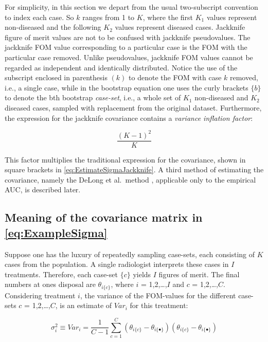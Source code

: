 \documentclass[
]{book}
\begin{document}
For simplicity, in this section we depart from the usual two-subscript convention to index each case. So \(k\) ranges from 1 to \(K\), where the first \(K_1\) values represent non-diseased and the following \(K_2\) values represent diseased cases. Jackknife figure of merit values are not to be confused with jackknife pseudovalues. The jackknife FOM value corresponding to a particular case is the FOM with the particular case removed. Unlike pseudovalues, jackknife FOM values cannot be regarded as independent and identically distributed. Notice the use of the subscript enclosed in parenthesis \((k)\) to denote the FOM with case \(k\) removed, i.e., a single case, while in the bootstrap equation one uses the curly brackets \(\{b\}\) to denote the bth bootstrap \emph{case-set}, i.e., a whole set of \(K_1\) non-diseased and \(K_2\) diseased cases, sampled with replacement from the original dataset. Furthermore, the expression for the jackknife covariance contains a \emph{variance inflation factor}:

\begin{equation}
\frac{(K-1)^2}{K}
\label{eq:JKVarianceInflationFactor}
\end{equation}

This factor multiplies the traditional expression for the covariance, shown in square brackets in \eqref{eq:EstimateSigmaJackknife}. A third method of estimating the covariance, namely the DeLong et al.~method \citep{RN112}, applicable only to the empirical AUC, is described later.

\hypertarget{meaning-of-the-covariance-matrix-in-refeqexamplesigma}{%
\subsection{Meaning of the covariance matrix in \eqref{eq:ExampleSigma}}\label{meaning-of-the-covariance-matrix-in-refeqexamplesigma}}

Suppose one has the luxury of repeatedly sampling case-sets, each consisting of \(K\) cases from the population. A single radiologist interprets these cases in \(I\) treatments. Therefore, each case-set \(\{c\}\) yields \(I\) figures of merit. The final numbers at ones disposal are \(\theta_{i\{c\}}\), where \(i\) = 1,2,\ldots,\(I\) and \(c\) = 1,2,\ldots,\(C\). Considering treatment \(i\), the variance of the FOM-values for the different case-sets \(c\) = 1,2,\ldots,\(C\), is an estimate of \(Var_i\) for this treatment:

\begin{equation}
\sigma_i^2 \equiv Var_i = \frac{1}{C-1}\sum_{c=1}^{C}\left ( \theta_{i\{c\}} - \theta_{i\{\bullet\}} \right) \left ( \theta_{i\{c\}} - \theta_{i\{\bullet\}} \right)
\label{eq:EstimateVari}
\end{equation}
\end{document}
